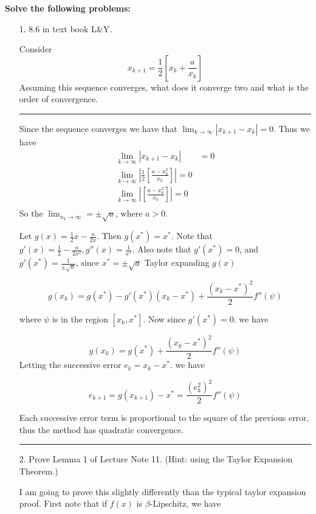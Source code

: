 \documentclass[12pt,letterpaper]{article}
\begin{document}
{\textbf{Solve the following problems:}}
\begin{enumerate}
\item[1.] 8.6 in text book L\&Y.



Consider 
\[
x_{k+1}= \frac{1}{2}[ x_k + \frac{a}{x_k}]
\]
Assuming this sequence converges, what does it converge two and what is the order of convergence. 

\rule{\textwidth}{1pt}

Since the sequence converges we have that $\lim_{k \to \infty} |x_{k+1} - x_{k}| = 0$. Thus we have
\begin{equation*}
\begin{aligned}
\lim_{k \to \infty} |x_{k+1} - x_{k} | &= 0 \\ 
\lim_{k \to \infty}| \frac{1}{2}[ \frac{ a  - x_k^2}{x_k}] | = 0 \\ 
\lim_{k \to \infty}| [ \frac{ a -  x_k^2}{x_k}] | = 0 \\ 
\end{aligned}
\end{equation*}
So the $\lim_{x_k \to \infty} = \pm \sqrt{a}$, where $a > 0$. 

Let $g(x) = \frac{1}{2} x - \frac{a}{2x}$. Then $g(x^{*}) = x^{*}$.  Note
that $g'(x) = \frac{1}{2} - \frac{a}{2x^2}, g\dprime(x) = \frac{1}{x^3}$. Also note that
$g'(x^{*}) = 0$, and $g\prime(x^{*}) = \frac{1}{\pm \sqrt{a}}$, since $x^* = \pm \sqrt{a}$
Taylor expanding $g(x)$

\[
g(x_k) = g(x^{*}) - g'(x^{*})(x_k - x^{*}) + \frac{(x_k - x^*)^2}{2} f\dprime (\psi)
\]

where $\psi$ is in the region $[x_k, x^{*}]$. Now since $g'(x^{*}) = 0$. we have 

\[
g(x_k) = g(x^{*}) +  \frac{(x_k - x^*)^2}{2} f\dprime (\psi)
\]
Letting the successive error $e_k = x_k - x^{*}$. we have

\[
e_{k+1} = g(x_{k+1}) - x^{*} =  \frac{(e_k^2)^2}{2} f\dprime (\psi)
\]



Each successive error term is proportional to the square of the previous error, thus the method has quadratic convergence.

\rule{\textwidth}{1pt}


\item[2.] Prove Lemma 1 of Lecture Note 11. (Hint: using the Taylor Expansion Theorem.)


I am going to prove this slightly differently than the typical taylor expansion proof. First note that if $f(x)$ is $\beta$-Lipschitz, we have


\end{enumerate}
\end{document}
